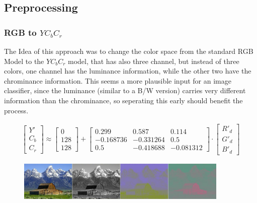 \subsection{Preprocessing}
\subsubsection{RGB to $YC_bC_r$}
The Idea of this approach was to change the color space from the standard RGB Model to the $YC_bC_r$ model, that has also three channel, but instead of three colors, one channel has the luminance information, while the other two have the chrominance information. This seems a more plausible input for an image classifier, since the luminance (similar to a B/W version) carries very different information than the chrominance, so seperating this early should benefit the process. 

\begin{align}
\left[\begin{array}{c}Y' \\ C_b \\ C_r\end{array}\right]
\approx
\left[\begin{array}{c}0  \\ 128 \\ 128\end{array}\right]
+
\left[\begin{array}{ccc} 0.299 & 0.587 & 0.114\\ -0.168736 & -0.331264 & 0.5  \\ 0.5 & -0.418688 & -0.081312\end{array}\right]
\cdot
\left[\begin{array}{c}R'_d \\ G'_d \\ B'_d\end{array}\right]\label{eq:ycc}
\end{align}

\begin{figure}
\includegraphics[width=0.9\textwidth]{./img/barn_rgb_ycc.jpg}

\end{figure}

